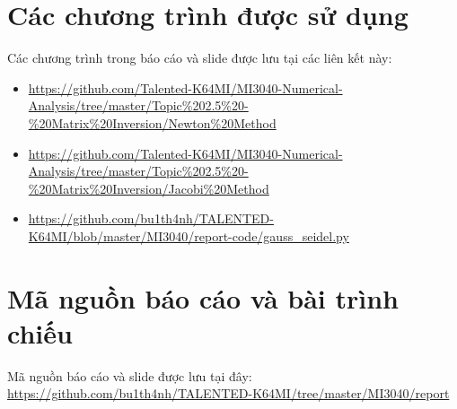 \newpage
\appendix
\addappheadtotoc
\renewcommand{\thesection}{\Alph{section}}
\section{Các chương trình được sử dụng}
    \par Các chương trình trong báo cáo và slide được lưu tại các liên kết này:
    \begin{itemize}
        \item \url{https://github.com/Talented-K64MI/MI3040-Numerical-Analysis/tree/master/Topic%202.5%20-%20Matrix%20Inversion/Newton%20Method}
        \item \url{https://github.com/Talented-K64MI/MI3040-Numerical-Analysis/tree/master/Topic%202.5%20-%20Matrix%20Inversion/Jacobi%20Method}
        \item \url{https://github.com/bu1th4nh/TALENTED-K64MI/blob/master/MI3040/report-code/gauss_seidel.py} 
    \end{itemize}

\section{Mã nguồn báo cáo và bài trình chiếu}
    \par Mã nguồn báo cáo và slide được lưu tại đây: \url{https://github.com/bu1th4nh/TALENTED-K64MI/tree/master/MI3040/report}


